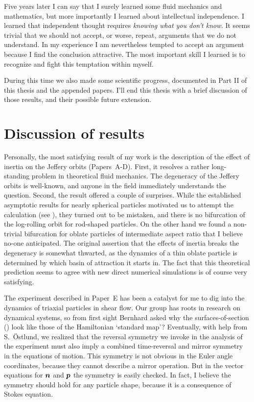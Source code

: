 \documentclass[thesis.tex]{subfiles}
\begin{document}
Five years later I can say that I surely learned some fluid mechanics and mathematics, but more importantly I learned about intellectual independence. I learned that independent thought requires \emph{knowing what you don't know.} It seems trivial that we should not accept, or worse, repeat, arguments that we do not understand. In my experience I am nevertheless tempted to accept an argument because I find the conclusion attractive. The most important skill I learned is to recognize and fight this temptation within myself.

During this time we also made some scientific progress, documented in Part II of this thesis and the appended papers. I'll end this thesis with a brief discussion of those results, and their possible future extension.

\section{Discussion of results}

Personally, the most satisfying result of my work is the description of the effect of inertia on the Jeffery orbits (Papers~A-D). First, it resolves a rather long-standing problem in theoretical fluid mechanics. The degeneracy of the Jeffery orbits is well-known, and anyone in the field immediately understands the question. Second, the result offered a couple of surprises. While the established asymptotic results for nearly spherical particles motivated us to attempt the calculation (see ), they turned out to be mistaken, and there is no bifurcation of the log-rolling orbit for rod-shaped particles. On the other hand we found a non-trivial bifurcation for oblate particles of intermediate aspect ratio that I believe no-one anticipated. The original assertion that the effects of inertia breaks the degeneracy is somewhat thwarted, as the dynamics of a thin oblate particle is determined by which basin of attraction it starts in. The fact that this theoretical prediction seems to agree with new direct numerical simulations is of course very satisfying.

The experiment described in Paper~E has been a catalyst for me to dig into the dynamics of triaxial particles in shear flow. Our group has roots in research on dynamical systems, so from first sight Bernhard asked why the surfaces-of-section () look like those of the Hamiltonian {\lq}standard map{\rq}? Eventually, with help from S.~Östlund, we realized that the reversal symmetry we invoke in the analysis of the experiment must also imply a combined time-reversal and mirror symmetry in the equations of motion. This symmetry is not obvious in the Euler angle coordinates, because they cannot describe a mirror operation. But in the vector equations for $\mbox{\boldmath$n$}$ and $\mbox{\boldmath$p$}$ the symmetry is easily checked. In fact, I believe the symmetry should hold for any particle shape, because it is a consequence of Stokes equation.
\end{document}
